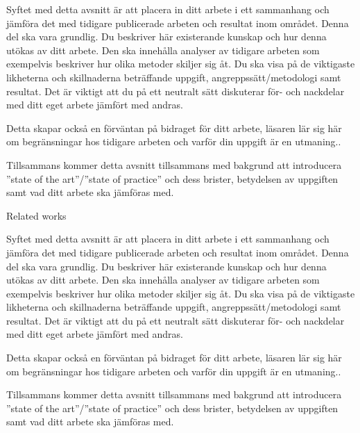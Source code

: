 
Syftet med detta avsnitt är att placera in ditt arbete i ett sammanhang och jämföra det med tidigare publicerade arbeten och resultat inom området. Denna del ska vara grundlig. Du beskriver här existerande kunskap och hur denna utökas av ditt arbete. Den ska innehålla analyser av tidigare arbeten som exempelvis beskriver hur olika metoder skiljer sig åt. Du ska visa på de viktigaste likheterna och skillnaderna beträffande uppgift, angreppssätt/metodologi samt resultat. Det är viktigt att du på ett neutralt sätt diskuterar för- och nackdelar med ditt eget arbete jämfört med andras.

Detta skapar också en förväntan på bidraget för ditt arbete, läsaren lär sig här om begränsningar hos tidigare arbeten och varför din uppgift är en utmaning.. 

Tillsammans kommer detta avsnitt tillsammans med bakgrund att introducera ”state of the art”/”state of practice” och dess brister, betydelsen av uppgiften samt vad ditt arbete ska jämföras med.

Related works

Syftet med detta avsnitt är att placera in ditt arbete i ett sammanhang och jämföra det med tidigare publicerade arbeten och resultat inom området. Denna del ska vara grundlig. Du beskriver här existerande kunskap och hur denna utökas av ditt arbete. Den ska innehålla analyser av tidigare arbeten som exempelvis beskriver hur olika metoder skiljer sig åt. Du ska visa på de viktigaste likheterna och skillnaderna beträffande uppgift, angreppssätt/metodologi samt resultat. Det är viktigt att du på ett neutralt sätt diskuterar för- och nackdelar med ditt eget arbete jämfört med andras.

Detta skapar också en förväntan på bidraget för ditt arbete, läsaren lär sig här om begränsningar hos tidigare arbeten och varför din uppgift är en utmaning.. 

Tillsammans kommer detta avsnitt tillsammans med bakgrund att introducera ”state of the art”/”state of practice” och dess brister, betydelsen av uppgiften samt vad ditt arbete ska jämföras med.
